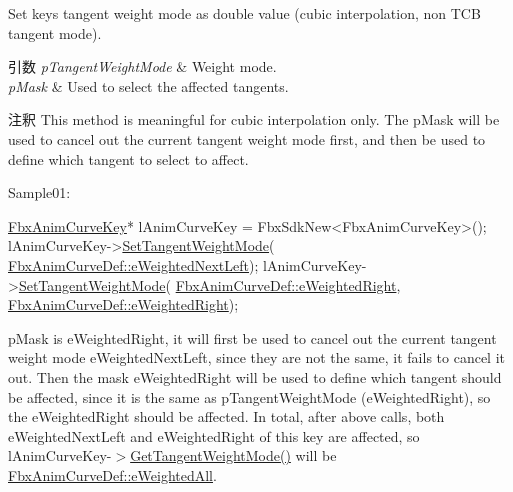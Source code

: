 Set key\textquotesingle{}s tangent weight mode as double value (cubic interpolation, non T\+CB tangent mode). 
\begin{DoxyParams}{引数}
{\em p\+Tangent\+Weight\+Mode} & Weight mode. \\
\hline
{\em p\+Mask} & Used to select the affected tangents. \\
\hline
\end{DoxyParams}
\begin{DoxyRemark}{注釈}
This method is meaningful for cubic interpolation only. The p\+Mask will be used to cancel out the current tangent weight mode first, and then be used to define which tangent to select to affect.
\end{DoxyRemark}
Sample01\+: 
\begin{DoxyCode}
\hyperlink{class_fbx_anim_curve_key}{FbxAnimCurveKey}* lAnimCurveKey = FbxSdkNew<FbxAnimCurveKey>();
lAnimCurveKey->\hyperlink{class_fbx_anim_curve_key_a418159da0643ccdbeb5aa59b69b821e0}{SetTangentWeightMode}(
      \hyperlink{class_fbx_anim_curve_def_aeee6e9cc12501e10dbd3e5caaf66990eae28d75f955feebe5756d77ad0765d000}{FbxAnimCurveDef::eWeightedNextLeft});
lAnimCurveKey->\hyperlink{class_fbx_anim_curve_key_a418159da0643ccdbeb5aa59b69b821e0}{SetTangentWeightMode}(
      \hyperlink{class_fbx_anim_curve_def_aeee6e9cc12501e10dbd3e5caaf66990ea869960737022db21fc64480daa22725a}{FbxAnimCurveDef::eWeightedRight}, 
      \hyperlink{class_fbx_anim_curve_def_aeee6e9cc12501e10dbd3e5caaf66990ea869960737022db21fc64480daa22725a}{FbxAnimCurveDef::eWeightedRight});
\end{DoxyCode}
 p\+Mask is e\+Weighted\+Right, it will first be used to cancel out the current tangent weight mode e\+Weighted\+Next\+Left, since they are not the same, it fails to cancel it out. Then the mask e\+Weighted\+Right will be used to define which tangent should be affected, since it is the same as p\+Tangent\+Weight\+Mode (e\+Weighted\+Right), so the e\+Weighted\+Right should be affected. In total, after above calls, both e\+Weighted\+Next\+Left and e\+Weighted\+Right of this key are affected, so l\+Anim\+Curve\+Key-\/$>$\hyperlink{class_fbx_anim_curve_key_a6971443814d64229442becc934315c56}{Get\+Tangent\+Weight\+Mode()} will be \hyperlink{class_fbx_anim_curve_def_aeee6e9cc12501e10dbd3e5caaf66990ea4337e6853fab642c2a432ab1bb303922}{Fbx\+Anim\+Curve\+Def\+::e\+Weighted\+All}.

